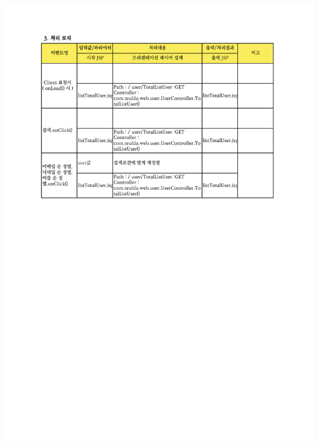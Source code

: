 {{{{{{{{{{{{{{{{{{{{{{{{{{{{{{{{{{{{{{{{{{{{{{{{{{{{{{{{{{{{{{{{{{{{{{{{{{{{{{{{{{{\includegraphics[width=20cm]{./Figure/Design/Display/totalSearch/totalSearch_06.pdf} \\
}}}}}}}}}}}}}}}}}}}}}}}}}}}}}}}}}}}}}}}}}}}}}}}}}}}}}}}}}}}}}}}}}}}}}}}}}}}}}}}}}}}
